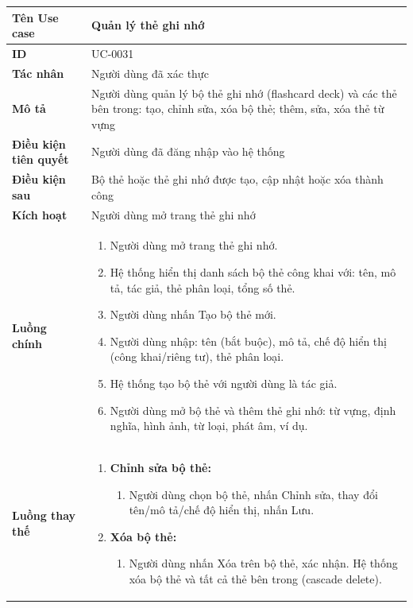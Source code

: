 {
\renewcommand{\arraystretch}{1.5}

\begin{tabularx}{\textwidth}{|>{\raggedright\arraybackslash}X|>{\raggedright\arraybackslash}X|}
\hline
\textbf{Tên Use case} & Quản lý thẻ ghi nhớ \\
\hline
\textbf{ID} & UC-0031 \\
\hline
\textbf{Tác nhân} & Người dùng đã xác thực \\
\hline
\textbf{Mô tả} & Người dùng quản lý bộ thẻ ghi nhớ (flashcard deck) và các thẻ bên trong: tạo, chỉnh sửa, xóa bộ thẻ; thêm, sửa, xóa thẻ từ vựng \\
\hline
\textbf{Điều kiện tiên quyết} & Người dùng đã đăng nhập vào hệ thống \\
\hline
\textbf{Điều kiện sau} & Bộ thẻ hoặc thẻ ghi nhớ được tạo, cập nhật hoặc xóa thành công \\
\hline
\textbf{Kích hoạt} & Người dùng mở trang thẻ ghi nhớ \\
\hline
\textbf{Luồng chính} &
\begin{enumerate}
    \item Người dùng mở trang thẻ ghi nhớ.
    \item Hệ thống hiển thị danh sách bộ thẻ công khai với: tên, mô tả, tác giả, thẻ phân loại, tổng số thẻ.
    \item Người dùng nhấn Tạo bộ thẻ mới.
    \item Người dùng nhập: tên (bắt buộc), mô tả, chế độ hiển thị (công khai/riêng tư), thẻ phân loại.
    \item Hệ thống tạo bộ thẻ với người dùng là tác giả.
    \item Người dùng mở bộ thẻ và thêm thẻ ghi nhớ: từ vựng, định nghĩa, hình ảnh, từ loại, phát âm, ví dụ.
\end{enumerate} \\
\hline
\textbf{Luồng thay thế} &
\begin{enumerate}
    \item \textbf{Chỉnh sửa bộ thẻ:}
    \begin{enumerate}
        \item[3A.] Người dùng chọn bộ thẻ, nhấn Chỉnh sửa, thay đổi tên/mô tả/chế độ hiển thị, nhấn Lưu.
    \end{enumerate}
    \item \textbf{Xóa bộ thẻ:}
    \begin{enumerate}
        \item[3B.] Người dùng nhấn Xóa trên bộ thẻ, xác nhận. Hệ thống xóa bộ thẻ và tất cả thẻ bên trong (cascade delete).

\end{enumerate}
\end{enumerate}
\end{tabularx}}
